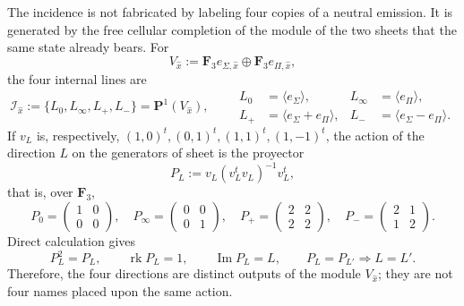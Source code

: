 The incidence is not fabricated by labeling four copies of a neutral emission.
It is generated by the free cellular completion of the module of the two sheets that
the same state already bears. For
\[
 V_{\widehat x}:=\mathbf F_3e_{\Sigma,\widehat x}
 \oplus\mathbf F_3e_{\Pi,\widehat x},
\]
the four internal lines are
\begin{equation}
\label{eq:pdfv2-cor-cuatro-rectas-tpk}
 \mathscr I_{\widehat x}:=
 \{L_0,L_\infty,L_+,L_-\}
 =\mathbf P^1(V_{\widehat x}),\qquad
 \begin{aligned}
 L_0&=\langle e_\Sigma\rangle,&
 L_\infty&=\langle e_\Pi\rangle,\\
 L_+&=\langle e_\Sigma+e_\Pi\rangle,&
 L_-&=\langle e_\Sigma-e_\Pi\rangle.
 \end{aligned}
\end{equation}
If \(v_L\) is, respectively,
\((1,0)^t,(0,1)^t,(1,1)^t,(1,-1)^t\), the action of the direction \(L\)
on the generators of sheet is the proyector
\begin{equation}
\label{eq:pdfv2-cor-proyectores-cuatro-direcciones}
 P_L:=v_L(v_L^tv_L)^{-1}v_L^t,
\end{equation}
that is, over \(\mathbf F_3\),
\[
 P_0=\begin{pmatrix}1&0\\0&0\end{pmatrix},\quad
 P_\infty=\begin{pmatrix}0&0\\0&1\end{pmatrix},\quad
 P_+=\begin{pmatrix}2&2\\2&2\end{pmatrix},\quad
 P_-=\begin{pmatrix}2&1\\1&2\end{pmatrix}.
\]
Direct calculation gives
\begin{equation}
\label{eq:pdfv2-cor-proyectores-no-colapso}
 P_L^2=P_L,\qquad \operatorname{rk}P_L=1,\qquad
 \operatorname{Im}P_L=L,\qquad
 P_L=P_{L'}\Longrightarrow L=L'.
\end{equation}
Therefore, the four directions are distinct outputs of the module
\(V_{\widehat x}\); they are not four names placed upon the same action.

